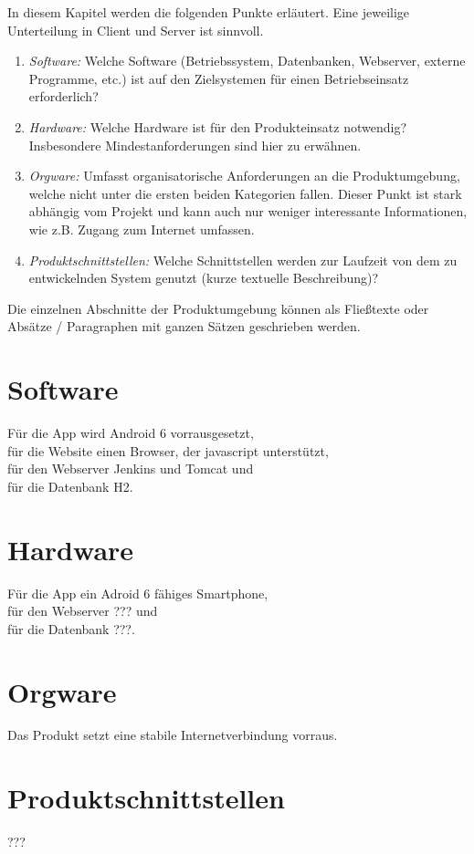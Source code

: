 \begin{tcolorbox}
In diesem Kapitel werden die folgenden Punkte erläutert. Eine jeweilige Unterteilung in Client und Server ist sinnvoll.
\begin{enumerate}
	\item \textit{Software:} Welche Software (Betriebssystem, Datenbanken, Webserver, externe Programme, etc.) ist auf den Zielsystemen für einen Betriebseinsatz erforderlich?
	\item \textit{Hardware:} Welche Hardware ist für den Produkteinsatz notwendig? Insbesondere Mindestanforderungen sind hier zu erwähnen.
	\item \textit{Orgware:} Umfasst organisatorische Anforderungen an die Produktumgebung, welche nicht unter die ersten beiden Kategorien fallen. 
	Dieser Punkt ist stark abhängig vom Projekt und kann auch nur weniger interessante Informationen, wie z.B. Zugang zum Internet umfassen.
	\item \textit{Produktschnittstellen:} Welche Schnittstellen werden zur Laufzeit von dem zu entwickelnden System genutzt (kurze textuelle Beschreibung)?
\end{enumerate}

\noindent Die einzelnen Abschnitte der Produktumgebung können als Fließtexte oder Absätze / Paragraphen mit ganzen Sätzen geschrieben werden.
\end{tcolorbox}

\section{Software}

Für die App wird Android 6 vorrausgesetzt, \\
für die Website einen Browser, der javascript unterstützt, \\
für den Webserver Jenkins und Tomcat und \\
für die Datenbank H2.\\

\section{Hardware}

Für die App ein Adroid 6 fähiges Smartphone, \\
für den Webserver ??? und \\
für die Datenbank ???.

\section{Orgware}

Das Produkt setzt eine stabile Internetverbindung vorraus.

\section{Produktschnittstellen}

???